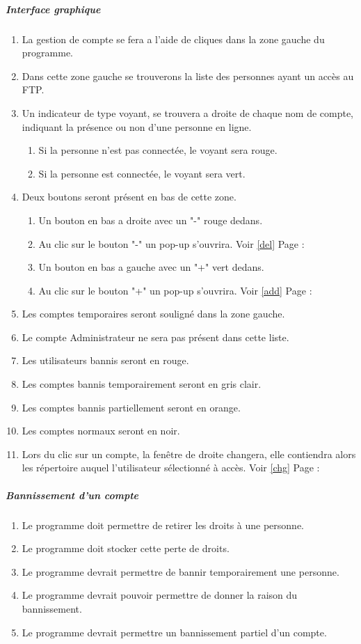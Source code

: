 \documentclass[10pt,a4paper]{report}
\begin{document}
	\subparagraph{Interface graphique}
		\begin{enumerate}
			\item La gestion de compte se fera a l'aide de cliques dans la zone gauche du programme.\label{cpt} 
			\item Dans cette zone gauche se trouverons la liste des personnes ayant un accès au FTP.
			\item Un indicateur de type voyant, se trouvera a droite de chaque nom de compte, indiquant la présence ou non d'une personne en ligne.
			\begin{enumerate}[label=\arabic*.]
				\item Si la personne n'est pas connectée, le voyant sera rouge.
				\item Si la personne est connectée, le voyant sera vert.
			\end{enumerate} 
			\item Deux boutons seront présent en bas de cette zone.
			\begin{enumerate}[label=\arabic*.]
				\item Un bouton en bas a droite avec un "-" rouge dedans.\label{bgr} 
				\item Au clic sur le bouton "-" un pop-up s'ouvrira. Voir \ref{del} Page : \pageref{del}
				\item Un bouton en bas a gauche avec un "+" vert dedans.\label{bdv}
				\item Au clic sur le bouton "+" un pop-up s'ouvrira. Voir \ref{add} Page : \pageref{add}
			\end{enumerate} 
			\item Les comptes temporaires seront souligné dans la zone gauche.
			\item Le compte Administrateur ne sera pas présent dans cette liste.
			\item Les utilisateurs bannis seront en rouge.
			\item Les comptes bannis temporairement seront en gris clair.
			\item Les comptes bannis partiellement seront en orange.
			\item Les comptes normaux seront en noir.
			\item Lors du clic sur un compte, la fenêtre de droite changera, elle contiendra alors les répertoire auquel l'utilisateur sélectionné à accès. Voir \ref{chg} Page : \pageref{chg}
		\end{enumerate}
	
	\subparagraph{Bannissement d'un compte}
		\begin{enumerate}
			\item Le programme doit permettre de retirer les droits à une personne.
			\item Le programme doit stocker cette perte de droits.
			\item Le programme devrait permettre de bannir temporairement une personne.
			\item Le programme devrait pouvoir permettre de donner la raison du bannissement.
			\item Le programme devrait permettre un bannissement partiel d'un compte.
		\end{enumerate}
	
\end{document}
